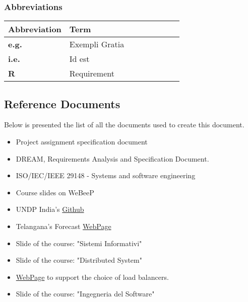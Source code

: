 \subsubsection{Abbreviations}
\begin{center}
    \begin{tabular}{p{0.35\linewidth} p{0.65\linewidth}}
    \hline
        \textbf{Abbreviation} & \textbf{Term}\\
    \hline
        \textbf{e.g.} & Exempli Gratia\\
        \textbf{i.e.} & Id est\\
        \textbf{R} & Requirement\\
    \hline
    \end{tabular}
\end{center}
\newpage

\subsection{Reference Documents}
Below is presented the list of all the documents used to create this document.
\begin{itemize}
    \item Project assignment specification document
    \item DREAM, Requirements Analysis and Specification Document.
    \item ISO/IEC/IEEE 29148 - Systems and software engineering
    \item Course slides on WeBeeP
    \item UNDP India’s \href{https://github.com/UNDP-India/Data4Policy}{Github}
    \item Telangana’s Forecast \href{https://www.tsdps.telangana.gov.in/aws.jsp}{WebPage}
    \item Slide of the course: "Sistemi Informativi"
    \item Slide of the course: "Distributed System"
    \item \href{ https://severalnines.com/database-blog/how-does-database-load-balancer-work}{WebPage} to support the choice of load balancers.
    \item Slide of the course: "Ingegneria del Software"
\end{itemize}

